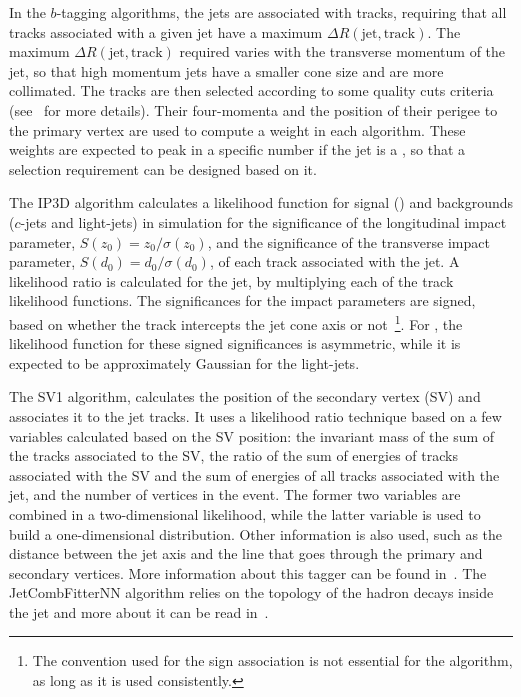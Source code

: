 In the $b$-tagging algorithms, the jets are associated with tracks, requiring that all tracks associated with a given jet have a maximum $\Delta R(\textrm{jet},\textrm{track})$.
The maximum $\Delta R(\textrm{jet},\textrm{track})$ required varies with the transverse momentum of the jet, so that high momentum jets have a smaller cone size and are
more collimated. The tracks are then selected according to some quality cuts criteria (see~\cite{btagalgos} for more details). Their four-momenta and the position of their
perigee to the primary vertex are used to compute a weight in each algorithm. These weights are expected to peak in a specific number if the jet is a \bjet, so that a selection
requirement can be designed based on it.

The IP3D algorithm calculates a likelihood function for signal (\bjets) and backgrounds ($c$-jets and light-jets) in
simulation for the significance of the longitudinal impact parameter, $S(z_0) = z_0/\sigma(z_0)$, and the significance of the transverse impact parameter,
$S(d_0) = d_0/\sigma(d_0)$, of each track
associated with the jet. A likelihood ratio is calculated for the jet, by multiplying each of the track likelihood functions. The significances for the impact parameters
are signed, based on whether the track intercepts the jet cone axis or not~\footnote{The convention used for the sign association is not essential for the algorithm,
as long as it is used consistently.}. For \bjets, the likelihood function for these signed significances is asymmetric, while it is expected to be approximately Gaussian
for the light-jets.

The SV1 algorithm, calculates the position of the secondary vertex (SV) and associates it to the jet tracks. It uses a likelihood ratio
technique based on a few variables calculated based on the SV position: the invariant mass of the sum of the tracks associated
to the SV, the ratio of the sum of energies of tracks associated with the SV and the sum of energies of all tracks associated with the jet, and the number of vertices
in the event. The former two variables are combined in a two-dimensional likelihood, while the latter variable is used to build a one-dimensional distribution. Other information
is also used, such as the distance between the jet axis and the line that goes through the primary and secondary vertices. More information about this tagger can be found
in~\cite{btagalgos}. The JetCombFitterNN algorithm relies on the topology of the hadron decays inside the jet and more about it can be read in~\cite{btag2011,mv1note,btagalgos}.

